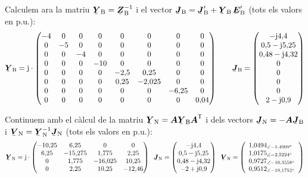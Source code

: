 \begin{exemple}
Calculem ara la matriu $\mcmplx{Y}\ped{B}=\mcmplx{Z}\ped{B}^{-1}$ i el vector $\mcmplx{J}\ped{B} = \mcmplx{J}\ped{B}' + \mcmplx{Y}\ped{B} \,\mcmplx{E}\ped{B}'$  (tots els valors en p.u.):
\[
   \mcmplx{Y}\ped{B} = \ju \cdot
   \begin{pmatrix}
     -4 & 0 & 0 & 0 & 0 & 0 & 0 & 0 \\
     0 & -5 & 0 & 0 & 0 & 0 & 0 & 0 \\
     0 & 0 & -4 & 0 & 0 & 0 & 0 & 0 \\
     0 & 0 & 0 & -10 & 0 & 0 & 0 & 0 \\
     0 & 0 & 0 & 0 & -2{,}5 & 0{,}25 & 0 & 0 \\
     0 & 0 & 0 & 0 & 0{,}25 & -2{,}025 & 0 & 0 \\
     0 & 0 & 0 & 0 & 0 & 0 & -6{,}25 & 0 \\
     0 & 0 & 0 & 0 & 0 & 0 & 0 & 0{,}04
   \end{pmatrix}
   \qquad
   \mcmplx{J}\ped{B} =
   \begin{pmatrix}
    -\ju 4{,}4 \\
    0{,}5 - \ju 5{,}25 \\
    0{,}48 - \ju 4{,}32 \\
    0 \\
    0 \\
    0 \\
    0 \\
    2 - \ju 0{,}9
   \end{pmatrix}
\]

Continuem amb el c\`{a}lcul de la matriu $\mcmplx{Y}\ped{N} =
\boldsymbol{A} \mcmplx{Y}\ped{B} \transp{\boldsymbol{A}}$ i dels
vectors $\mcmplx{J}\ped{N} = - \boldsymbol{A} \mcmplx{J}\ped{B}$ i
$\mcmplx{V}\ped{N} = \mcmplx{Y}\ped{N}^{-1} \mcmplx{J}\ped{N}$ (tots
els valors en p.u.):
\[
   \mcmplx{Y}\ped{N} = \ju \cdot
   \begin{pmatrix}
     -10{,}25 & 6{,}25 & 0 & 0 \\
     6{,}25 & -15{,}275 & 1{,}775 & 2{,}25 \\
     0 & 1{,}775 & -16{,}025 & 10{,}25 \\
     0 & 2{,}25 & 10{,}25 & -12{,}46
   \end{pmatrix}
   \;\;
   \mcmplx{J}\ped{N} =
   \begin{pmatrix}
    -\ju 4{,}4 \\
    0{,}5 - \ju 5{,}25 \\
    0{,}48 - \ju 4{,}32 \\
    -2 + \ju 0{,}9
   \end{pmatrix}
   \;\;
   \mcmplx{V}\ped{N} =
   \left(\begin{array}{l}
    1{,}0494_{\angle -1{,}4909\degree} \\
    1{,}0175_{\angle -2{,}5224\degree} \\
    0{,}9727_{\angle -10{,}3558\degree} \\
    0{,}9512_{\angle -19{,}1752\degree}
   \end{array}\right)
\]


\end{exemple}
